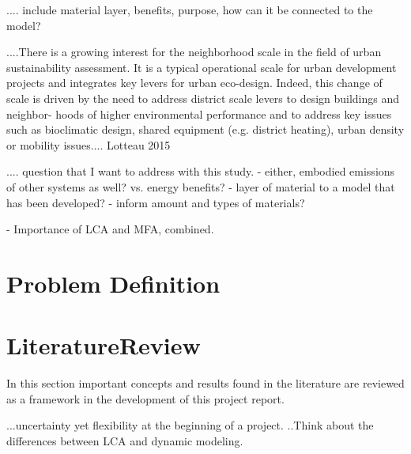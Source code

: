 
....  include material layer, benefits, purpose, how can it be connected to the model?


....There is a growing interest for the neighborhood scale in the field of urban sustainability assessment. It is a typical operational scale for urban development projects and integrates key levers for urban eco-design. Indeed, this change of scale is driven by the need to address district scale levers to design buildings and neighbor- hoods of higher environmental performance and to address key issues such as bioclimatic design, shared equipment (e.g. district heating), urban density or mobility issues.... Lotteau 2015

.... question that I want to address with this study.
			- either, embodied emissions of other systems as well? vs. energy benefits?
			- layer of material to a model that has been developed?
			- inform amount and types of materials?

- Importance of LCA and MFA, combined. 

\section{Problem Definition}

\section{LiteratureReview}
In this section important concepts and results found in the literature are reviewed as a framework in the development of this project report.






...uncertainty yet flexibility at the beginning of a project. 
..Think about the differences between LCA and dynamic modeling. 


